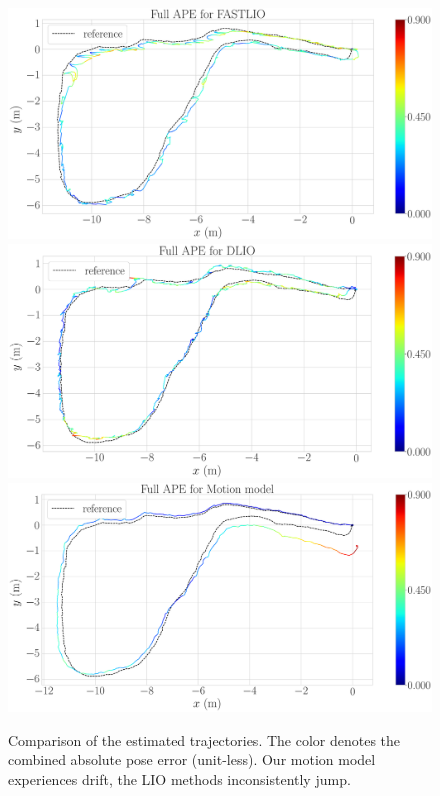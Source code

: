 \begin{figure}
  \centering 
  \includegraphics[width=\linewidth]{img/ape_fast_lio} \vskip 2mm
  \includegraphics[width=\linewidth]{img/ape_dlio} \vskip 2mm
  \includegraphics[width=\linewidth]{img/ape_model}
  \caption{Comparison of the estimated trajectories.
  The color denotes the combined absolute pose error (unit-less).
  Our motion model experiences drift, the LIO methods inconsistently jump.}
  \label{fig:ape}
\end{figure}

